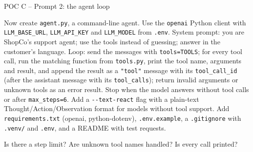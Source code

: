 \documentclass[aspectratio=169,11pt]{beamer}
\begin{document}
\begin{frame}{POC C -- Prompt 2: the agent loop}
  \begin{promptbox}
    \raggedright Now create \texttt{agent.py}, a command-line agent. Use the \texttt{openai} Python client with \texttt{LLM\_BASE\_URL}, \texttt{LLM\_API\_KEY} and \texttt{LLM\_MODEL} from \texttt{.env}. System prompt: you are ShopCo's support agent; use the tools instead of guessing; answer in the customer's language. Loop: send the messages with \texttt{tools=TOOLS}; for every tool call, run the matching function from \texttt{tools.py}, print the tool name, arguments and result, and append the result as a \texttt{"tool"} message with its \texttt{tool\_call\_id} (after the assistant message with its \texttt{tool\_calls}); return invalid arguments or unknown tools as an error result. Stop when the model answers without tool calls or after \texttt{max\_steps=6}. Add a \texttt{-{}-text-react} flag with a plain-text Thought/Action/Observation format for models without tool support. Add \texttt{requirements.txt} (openai, python-dotenv), \texttt{.env.example}, a \texttt{.gitignore} with \texttt{.venv/} and \texttt{.env}, and a README with test requests.
  \end{promptbox}
  \vspace{4pt}
  \begin{infobox}
    \footnotesize Is there a step limit? Are unknown tool names handled? Is every call printed?
  \end{infobox}
\end{frame}
\end{document}
